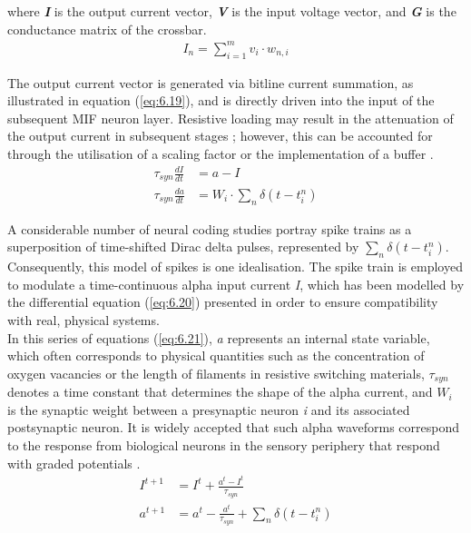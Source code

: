 \noindent where \textbf{\textit{I}} is the output current vector, \textbf{\textit{V}} is the input voltage vector, and \textbf{\textit{G}} is the conductance matrix of the crossbar.
\begin{align}
I_n = \sum_{i=1}^{m} v_i \cdot w_{n,i} \label{eq:6.19}
\end{align}

\noindent The output current vector is generated via bitline current summation, as illustrated in equation (\ref{eq:6.19}), and is directly driven into the input of the subsequent MIF neuron layer. Resistive loading may result in the attenuation of the output current in subsequent stages \cite{wang2020high}; however, this can be accounted for through the utilisation of a scaling factor or the implementation of a buffer \cite{wang2022low}.
\begin{align}
\tau_{syn} \frac{dI}{dt} &= a - I \label{eq:6.20} \\
\tau_{syn}\frac{da}{dt} &= W_i \cdot\sum_{n}\delta\left( t - t_i^n \right) \label{eq:6.21}
\end{align}

\noindent A considerable number of neural coding studies portray spike trains as a superposition of time-shifted Dirac delta pulses, represented by $\sum_{n}\delta\left( t - t_i^n \right)$. Consequently, this model of spikes is one idealisation. The spike train is employed to modulate a time-continuous alpha input current \textit{I}, which has been modelled by the differential equation (\ref{eq:6.20}) presented in order to ensure compatibility with real, physical systems. \\

\noindent In this series of equations (\ref{eq:6.21}), \textit{a} represents an internal state variable, which often corresponds to physical quantities such as the concentration of oxygen vacancies or the length of filaments in resistive switching materials, $\tau_{syn}$ denotes a time constant that determines the shape of the alpha current, and $W_i$ is the synaptic weight between a presynaptic neuron \textit{i} and its associated postsynaptic neuron. It is widely accepted that such alpha waveforms correspond to the response from biological neurons in the sensory periphery that respond with graded potentials \cite{eshraghian2018formulation}.
\begin{align}
I^{t+1} &=  I^t + \frac{a^t - I^t}{\tau_{syn}} \label{eq:6.22} \\
a^{t+1} &= a^t - \frac{a^t}{\tau_{syn}} + \sum_{n}\delta\left( t - t_i^n \right)\label{eq:6.23}
\end{align}


